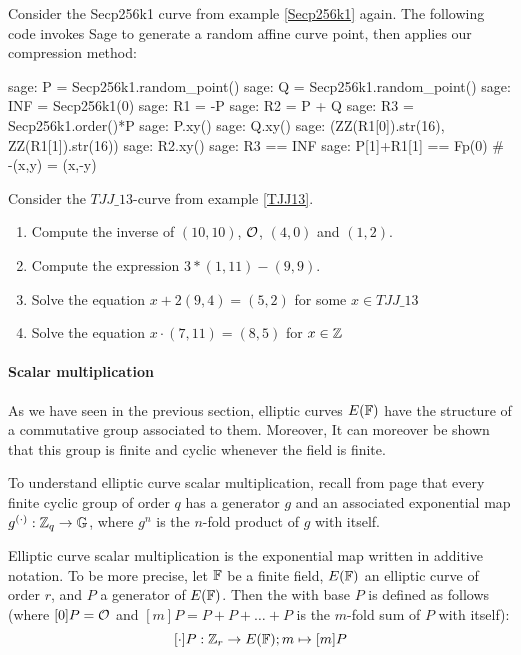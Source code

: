 \begin{example}
Consider the Secp256k1 curve from example \ref{Secp256k1}  again. The following code invokes Sage to generate a random affine curve point, then applies our compression method:
\begin{sagecommandline}
sage: P = Secp256k1.random_point()
sage: Q = Secp256k1.random_point()
sage: INF = Secp256k1(0)
sage: R1 = -P
sage: R2 = P + Q
sage: R3 = Secp256k1.order()*P
sage: P.xy()
sage: Q.xy()
sage: (ZZ(R1[0]).str(16), ZZ(R1[1]).str(16))
sage: R2.xy()
sage: R3 == INF
sage: P[1]+R1[1] == Fp(0) # -(x,y) = (x,-y)
\end{sagecommandline}
\end{example}
\begin{exercise}
Consider the $\mathit{TJJ\_13}$-curve from example \ref{TJJ13}. 
\begin{enumerate}
\item Compute the inverse of $(10,10)$, $\mathcal{O}$, $(4,0)$ and $(1,2)$.
\item Compute the expression $3*(1,11) - (9,9)$.
\item Solve the equation $x + 2(9,4) = (5,2) $ for some $x\in \mathit{TJJ\_13}$
\item Solve the equation $x\cdot (7,11) = (8,5)$ for $x\in \mathbb{Z}$
\end{enumerate}
\end{exercise}
\paragraph{Scalar multiplication}
As we have seen in the previous section, elliptic curves $E(\mathbb{F})$ have the structure of a commutative group associated to them. Moreover, It can moreover be shown that this group is finite and cyclic whenever the field is finite. 

To understand elliptic curve scalar multiplication, recall from page \pageref{cyclic-groups} that every finite cyclic group of order $q$ has a generator $g$ and an associated exponential map $g^{(\cdot)}: \mathbb{Z}_q \to \mathbb{G}$, where $g^n$ is the $n$-fold product of $g$ with itself.  

Elliptic curve scalar multiplication is the exponential map written in additive notation. To be more precise, let $\mathbb{F}$ be a finite field, $E(\mathbb{F})$ an elliptic curve of order $r$, and $P$ a generator of $E(\mathbb{F})$. Then the  with base $P$ is defined as follows (where $[0]P = \mathcal{O}$ and $[m]P = P+P+\ldots + P$ is the $m$-fold sum of $P$ with itself):
$$
[\cdot]P: \mathbb{Z}_r \to E(\mathbb{F}); m \mapsto [m]P
$$


